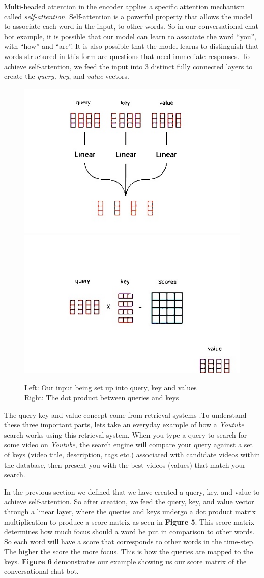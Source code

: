 Multi-headed attention in the encoder applies a specific attention mechanism called \emph{self-attention}. \cite{nine} Self-attention is a powerful property that allows the model to associate each word in the input, to other words. So in our conversational chat bot example, it is possible that our model can learn to associate the word “you”, with “how” and “are”. It is also possible that the model learns to distinguish that words structured in this form are questions that need immediate responses. To achieve self-attention, we feed the input into 3 distinct fully connected layers to create the \emph{query, key}, and \emph{value} vectors.

\begin{figure}[H]
\centering
\includegraphics[width=.45\textwidth]{figures/t4.jpg}
\includegraphics[width=.45\textwidth]{figures/t5.jpg}
\caption{
Left: Our input being set up into query, key and values\\
Right: The dot product between queries and keys
}
\end{figure}

The query key and value concept come from retrieval systems \cite{twelve}.To understand these three important parts, lets take an everyday example of how a \emph{Youtube} search works using this retrieval system. When you type a query to search for some video on \emph{Youtube}, the search engine will compare your query against a set of keys (video title, description, tags etc.) associated with candidate videos within the database, then present you with the best videos (values) that match your search. 

In the previous section we defined that we have created a query, key, and value to achieve self-attention. So after creation, we feed the query, key, and value vector through a linear layer, where the queries and keys undergo a dot product matrix multiplication to produce a score matrix as seen in \textbf{Figure 5}. This score matrix determines how much focus should a word be put in comparison to other words. So each word will have a score that corresponds to other words in the time-step. The higher the score the more focus. This is how the queries are mapped to the keys. \textbf{Figure 6} demonstrates our example showing us our score matrix of the conversational chat bot.

